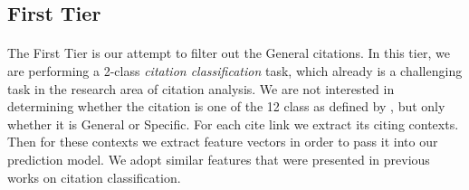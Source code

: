\subsection{First Tier}
\paragraph{}
The First Tier is our attempt to filter out the General citations. In this tier, we are performing a 2-class \textit{citation classification} task, which already is a challenging task in the research area of citation analysis. We are not interested in determining whether the citation is one of the 12 class as defined by \cite{teufel2009annotation}, but only whether it is General or Specific. For each cite link we extract its citing contexts. Then for these contexts we extract feature vectors in order to pass it into our prediction model. We adopt similar features that were presented in previous works on citation classification.

